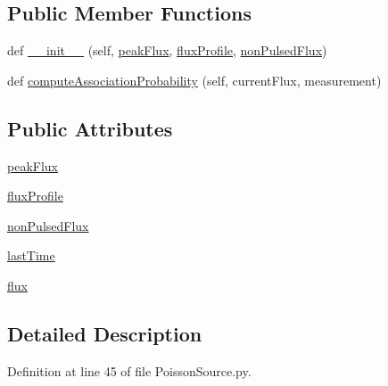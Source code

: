 \subsection*{Public Member Functions}
\begin{DoxyCompactItemize}
\item 
def \hyperlink{classmodest_1_1signals_1_1PoissonSource_1_1__PeriodicPoissonSource_a335409999df39a5bf2acfce5192fd54c}{\+\_\+\+\_\+init\+\_\+\+\_\+} (self, \hyperlink{classmodest_1_1signals_1_1PoissonSource_1_1__PeriodicPoissonSource_a51d0bebe6b273f99cba60f17b6ff32b8}{peak\+Flux}, \hyperlink{classmodest_1_1signals_1_1PoissonSource_1_1__PeriodicPoissonSource_a685524f0f5a4a11ef3aefaa5916285de}{flux\+Profile}, \hyperlink{classmodest_1_1signals_1_1PoissonSource_1_1__PeriodicPoissonSource_af6dcdf16e85360c87b6efecaf53b653c}{non\+Pulsed\+Flux})
\item 
def \hyperlink{classmodest_1_1signals_1_1PoissonSource_1_1__PoissonSource_ab8100a2c9f0b5f850ff08f56e7a11cae}{compute\+Association\+Probability} (self, current\+Flux, measurement)
\end{DoxyCompactItemize}
\subsection*{Public Attributes}
\begin{DoxyCompactItemize}
\item 
\hyperlink{classmodest_1_1signals_1_1PoissonSource_1_1__PeriodicPoissonSource_a51d0bebe6b273f99cba60f17b6ff32b8}{peak\+Flux}
\item 
\hyperlink{classmodest_1_1signals_1_1PoissonSource_1_1__PeriodicPoissonSource_a685524f0f5a4a11ef3aefaa5916285de}{flux\+Profile}
\item 
\hyperlink{classmodest_1_1signals_1_1PoissonSource_1_1__PeriodicPoissonSource_af6dcdf16e85360c87b6efecaf53b653c}{non\+Pulsed\+Flux}
\item 
\hyperlink{classmodest_1_1signals_1_1PoissonSource_1_1__PoissonSource_a96ba5dd0643792be6fbf7af966515a01}{last\+Time}
\item 
\hyperlink{classmodest_1_1signals_1_1PoissonSource_1_1__PoissonSource_aab3036b1351c531257d2384ea0ff4ae5}{flux}
\end{DoxyCompactItemize}


\subsection{Detailed Description}


Definition at line 45 of file Poisson\+Source.\+py.



